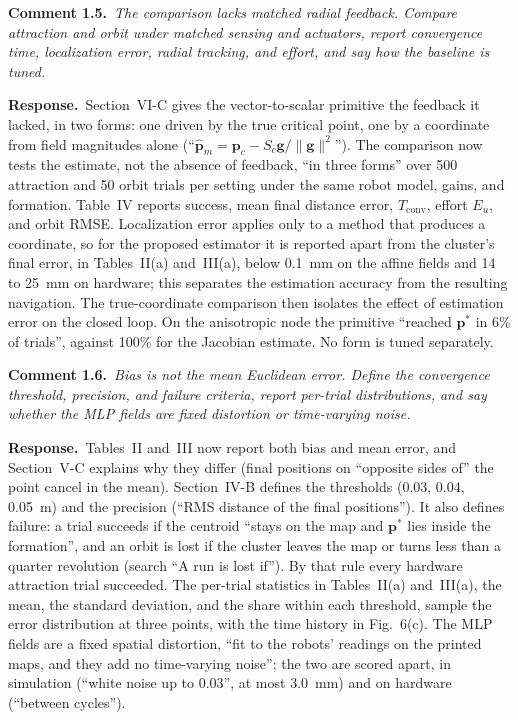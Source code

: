 \documentclass[10pt]{article}
\newcommand{\rev}[1]{#1}                             %
\newcommand{\cmt}[2]{\textbf{Comment #1.}~\textit{#2}\par}
\newcommand{\resp}{\par\textbf{Response.}~}
\begin{document}
\cmt{1.5}{The comparison lacks matched radial feedback. Compare attraction and orbit under matched sensing and actuators, report convergence time, localization error, radial tracking, and effort, and say how the baseline is tuned.}

\resp Section~VI-C gives the vector-to-scalar primitive the feedback it lacked, in two forms: one driven by the true critical point, one by a coordinate from field magnitudes alone (``$\hat{\mathbf{p}}_m = \mathbf{p}_c - S_c\mathbf{g}/\|\mathbf{g}\|^2$''). The comparison now tests the estimate, not the absence of feedback, ``in three forms'' over \rev{500} attraction and \rev{50} orbit trials per setting under the same robot model, gains, and formation. Table~IV reports success, mean final distance error, $T_{\mathrm{conv}}$, effort $E_u$, and orbit RMSE. Localization error applies only to a method that produces a coordinate, so for the proposed estimator it is reported apart from the cluster's final error, in Tables~II(a) and~III(a), below 0.1~mm on the affine fields and \rev{14} to \rev{25}~mm on hardware; this separates the estimation accuracy from the resulting navigation. The true-coordinate comparison then isolates the effect of estimation error on the closed loop. On the anisotropic node the primitive ``reached $\mathbf{p}^*$ in \rev{6}\% of trials'', against 100\% for the Jacobian estimate. No form is tuned separately.

\cmt{1.6}{Bias is not the mean Euclidean error. Define the convergence threshold, precision, and failure criteria, report per-trial distributions, and say whether the MLP fields are fixed distortion or time-varying noise.}

\resp Tables~II and~III now report both bias and mean error, and Section~V-C explains why they differ (final positions on ``opposite sides of'' the point cancel in the mean). Section~IV-B defines the thresholds (0.03, 0.04, 0.05~m) and the precision (``RMS distance of the final positions''). It also defines failure: a trial succeeds if the centroid ``stays on the map and $\mathbf{p}^*$ lies inside the formation'', and an orbit is lost if the cluster leaves the map or turns less than a quarter revolution (search ``A run is lost if''). By that rule every hardware attraction trial succeeded. The per-trial statistics in Tables~II(a) and~III(a), the mean, the standard deviation, and the share within each threshold, sample the error distribution at three points, with the time history in \rev{Fig.~6(c)}. The MLP fields are a fixed spatial distortion, ``fit to the robots' readings on the printed maps, and they add no time-varying noise''; the two are scored apart, in simulation (``white noise up to 0.03'', at most \rev{3.0}~mm) and on hardware (``between cycles'').
\end{document}
